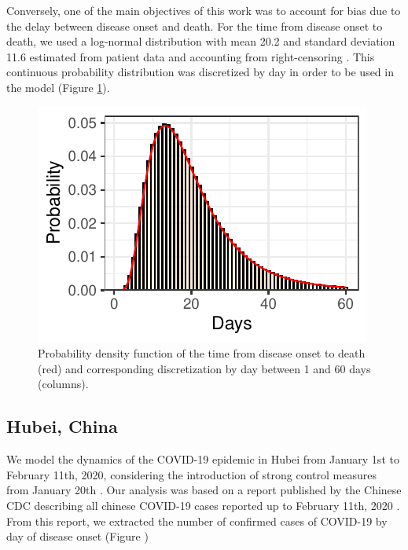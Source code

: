 \documentclass{article}
\begin{document}
	Conversely, one of the main objectives of this work was to account for bias due to the delay between disease onset and death.
	For the time from disease onset to death, we used a log-normal distribution with mean 20.2 and standard deviation 11.6 estimated from patient data and accounting from right-censoring \cite{linton2020incubation}.
	This continuous probability distribution was discretized by day in order to be used in the model (Figure \ref{fig:distribution_onset_to_death}).
	
	
	\begin{figure}[H]
		\centering
		\includegraphics{../format_output/figures/distribution_onset_to_death.pdf}
		\caption{Probability density function of the time from disease onset to death (red) and corresponding discretization by day between 1 and 60 days (columns).}
		\label{fig:distribution_onset_to_death}
	\end{figure}
	
	\subsection{Hubei, China}
	We model the dynamics of the COVID-19 epidemic in Hubei from January 1st to February 11th, 2020, considering the introduction of strong control measures from January 20th \cite{ChinaJointMissiononCoronavirusDisease2019Group2020}. 
	Our analysis was based on a report published by the Chinese CDC describing all chinese COVID-19 cases reported up to February 11th, 2020 \cite{Team2020}.
	From this report, we extracted the number of confirmed cases of COVID-19 by day of disease onset (Figure ) 
	
\end{document}
